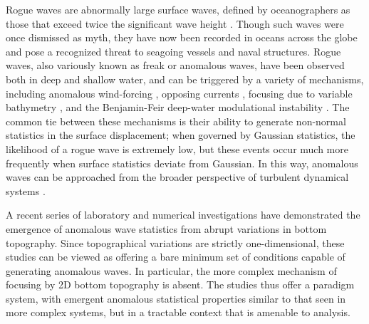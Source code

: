 \documentclass[11pt]{article}
\begin{document}
Rogue waves are abnormally large surface waves, defined by oceanographers as those that exceed twice the significant wave height \citep{muller2005rogue, ying2011linear}. Though such waves were once dismissed as myth, they have now been recorded in oceans across the globe and pose a recognized threat to seagoing vessels and naval structures. Rogue waves, also variously known as freak or anomalous waves, have been observed both in deep and shallow water, and can be triggered by a variety of mechanisms, including anomalous wind-forcing \citep{kharif2008influence, toffoli2017wind}, opposing currents \citep{garrett2009rogue, onorato2011triggering},
focusing due to variable bathymetry \citep{heller2008refraction, white1998chance}, 
and the Benjamin-Feir deep-water modulational instability \citep{benjamin1967disintegration, viotti2013emergence, cousins2015unsteady, farazmand2017reduced}.
The common tie between these mechanisms is their ability to generate non-normal statistics in the surface displacement; when governed by Gaussian statistics, the likelihood of a rogue wave is extremely low, but these events occur much more frequently when surface statistics deviate from Gaussian. In this way, anomalous waves can be approached from the broader perspective of turbulent dynamical systems \cite{sapsis2013a, sapsis2013b, sapsis2013blending, chen2016filtering, majda2016introduction, macedo2017universality, MajdaQiSIAM2018, blonigan2019extreme, guth2019machine}.

A recent series of laboratory \cite{bolles2019} and numerical investigations \cite{viotti2014} have demonstrated the emergence of anomalous wave statistics from abrupt variations in bottom topography. Since topographical variations are strictly one-dimensional, these studies can be viewed as offering a bare minimum set of conditions capable of generating anomalous waves. In particular, the more complex mechanism of focusing by 2D bottom topography is  absent. The studies thus offer a paradigm system, with emergent anomalous statistical properties similar to that seen in more complex systems, but in a tractable context that is amenable to analysis.
\end{document}
